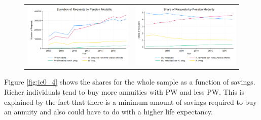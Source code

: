 \documentclass[12pt]{article}
\begin{document}
\begin{figure}[H]
\caption{}
 \label{fig:ie0_2and3}
\centering{}%
\begin{tabular}{cc}
\includegraphics[scale=0.27]{../figures/IE0_plot2.png} & \includegraphics[scale=0.27]{../figures/IE0_plot3.png}
\end{tabular}
\end{figure}


Figure \ref{fig:ie0_4} shows the shares for the whole sample as a function of savings. Richer individuals tend to buy more annuities with PW and less PW. This is explained by the fact that there is a minimum amount of savings required to buy an annuity and also could have to do with a higher life expectancy. 
\end{document}
